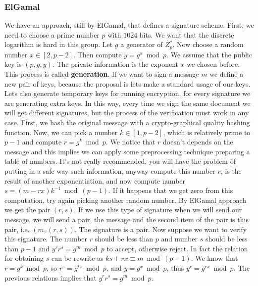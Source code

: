 \documentclass[11pt]{article}
\begin{document}
\subsubsection{ElGamal}
We have an approach, still by ElGamal, that defines a signature scheme. First, we need to choose a prime number $p$ with $1024$ bits. We want that the discrete logarithm is hard in this group. Let $g$ a generator of $Z_p^{*}$. Now choose a random number $x \in [2, p - 2]$. Then compute $y = g^x \bmod p$. We assume that the public key is $(p, g, y)$. The private information is the exponent $x$ we chosen before. This process is called \textbf{generation}. If we want to sign a message $m$ we define a new pair of keys, because the proposal is lets make a standard usage of our keys. Lets also generate temporary keys for running encryption, for every signature we are generating extra keys. In this way, every time we sign the same document we will get different signatures, but the process of the verification must work in any case. First, we hash the original message with a crypto-graphical quality hashing function. Now, we can pick a number $k \in [1, p - 2]$, which is relatively prime to $p - 1$ and compute $r = g^k \bmod p$. We notice that $r$ doesn't depends on the message and this implies we can apply some preprocessing technique preparing a table of numbers. It's not really recommended, you will have the problem of putting in a safe way such information, anyway compute this number $r$, is the result of another exponentiation, and now compute number $s = (m - rx)k^{-1} \bmod (p - 1)$. If it happens that we get zero from this computation, try again picking another random number. By ElGamal approach we get the pair $(r, s)$. If we use this type of signature when we will send our message, we will send a pair, the message and the second item of the pair is this pair, i.e. $(m, (r,s))$. The signature is a pair. Now suppose we want to verify this signature. The number $r$ should be less than $p$ and number $s$ should be less than $p - 1$ and $y^r r^s = g^m \bmod p$ to accept, otherwise reject. In fact the relation for obtaining $s$ can be rewrite as $ks + rx \equiv m \bmod (p -1)$. We know that $r = g^k \bmod p$, so $r^s = g^{ks} \bmod p$, and $y = g^x \bmod p$, thus $y^r = g^{rx} \bmod p$. The previous relations implies that $y^r r^s = g^m \bmod p$.
\end{document}
